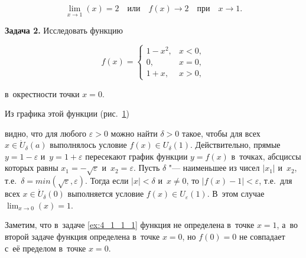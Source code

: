 \begin{equation*}
\displaystyle \lim_{x \to 1}(x) = 2 \quad \text{или} \quad
f(x) \to 2 \quad \text{при} \quad x \to 1.
\end{equation*}

\textbf{Задача 2.}\label{ex:4_1_1_2} Исследовать функцию

\begin{equation*}
f(x) = 
\begin{cases}
1-x^{2}, & x < 0, \\
0, & x = 0, \\
1 + x, & x > 0,
\end{cases}
\end{equation*}

\noindent
в~окрестности точки $x = 0$.

Из графика этой функции (рис.\ \ref{fig:4_1_1_3})

\begin{figure}\label{fig:4_1_1_3}
\end{figure}

\noindent
видно, что для любого $\varepsilon > 0$ можно найти $\delta > 0$ такое,
чтобы для всех $x \in \dot U_{\delta}(a)$ выполнялось условие
$f(x) \in U_{\delta}(1)$. 
Действительно, прямые $y = 1 - \varepsilon$ и~$y = 1 + \varepsilon$ пересекают
график функции $y = f(x)$ в~точках, абсциссы которых равны
$x_{1} = -\sqrt{\varepsilon}$ и~$x_{2} = \varepsilon$.
Пусть $\delta$ "--- наименьшее из чисел $|x_{1}|$ и~$x_{2}$,
т.е.\ $\delta = min(\sqrt{\varepsilon}, \varepsilon)$.
Тогда если $|x| < \delta$ и~$x \ne 0$, то $\left| f(x) - 1 \right| < \varepsilon$,
т.е.\ для всех $x \in \dot U_{\delta}(0)$ выполняется условие
$f(x) \in U_{\varepsilon}(1)$.
В~этом случае $\displaystyle \lim_{x \to 0} (x) = 1$.

Заметим, что в~задаче \ref{ex:4_1_1_1} функция не определена в~точке $x = 1$,
а~во второй задаче функция определена в~точке $x = 0$,
но $f(0) = 0$ не совпадает с~её пределом в~точке $x = 0$.

